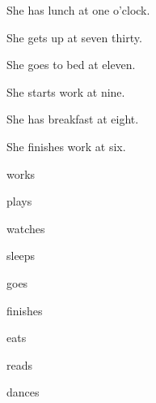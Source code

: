 \begin{anglais}
\begin{questions}[2][english]
\item[a.] She has lunch at one o'clock.
\item[b.] She gets up at seven thirty.
\item[c.] She goes to bed at eleven.
\item[d.] She starts work at nine.
\item[e.] She has breakfast at eight.
\item[f.] She finishes work at six.
\end{questions}
\end{anglais}
\par\vspace{2mm}\hspace{4mm}%
\hspace{3mm}\hspace{3mm}\hspace{3mm}\hspace{3mm}\hspace{3mm}

\begin{questions}[3]
\item works \hfill {}  
\item plays \hfill {}  
\item watches \hfill {}  
\item sleeps \hfill {}  
\item goes \hfill {}  
\item finishes \hfill {}  
\item eats \hfill {}  
\item reads \hfill {}  
\item dances \hfill {}  
\end{questions}

